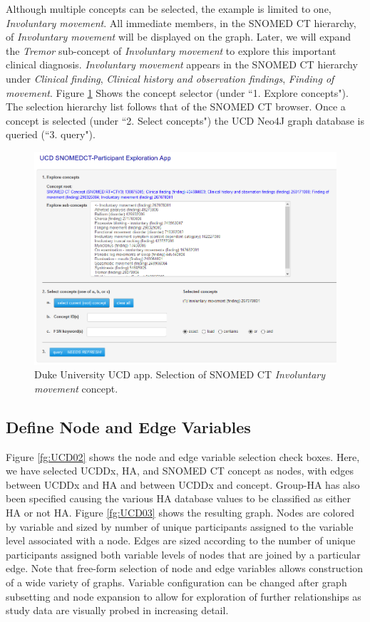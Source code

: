 \documentclass[10pt, letterpaper]{article}
\begin{document}
\begin{spacing}{1.0}
Although multiple concepts can be selected, the example is limited to one, \textit{Involuntary movement}.  All immediate members, in the SNOMED CT hierarchy, of \textit{Involuntary movement} will be displayed on the graph.  Later, we will expand the \textit{Tremor} sub-concept of \textit{Involuntary movement} to explore this important clinical diagnosis.  \textit{Involuntary movement} appears in the SNOMED CT hierarchy under \textit{Clinical finding}, \textit{Clinical history and observation findings}, \textit{Finding of movement}.  Figure \ref{fg:UCD01} Shows the concept selector (under ``1. Explore concepts").  The selection hierarchy list follows that of the SNOMED CT browser.  Once a concept is selected (under ``2. Select concepts") the UCD Neo4J graph database is queried (``3. query").

\begin{figure}[H]
    \includegraphics[width=6in]{UCD01.png}
    \centering
    \caption{Duke University UCD app.  Selection of SNOMED CT \textit{Involuntary movement} concept.}
    \label{fg:UCD01}
\end{figure}

\subsection{Define Node and Edge Variables}

Figure \ref{fg:UCD02} shows the node and edge variable selection check boxes.  Here, we have selected UCDDx, HA, and SNOMED CT concept as nodes, with edges between UCDDx and HA and between UCDDx and concept.  Group-HA has also been specified causing the various HA database values to be classified as either HA or not HA.  Figure \ref{fg:UCD03} shows the resulting graph.  Nodes are colored by variable and sized by number of unique participants assigned to the variable level associated with a node.  Edges are sized according to the number of unique participants assigned both variable levels of nodes that are joined by a particular edge.  Note that free-form selection of node and edge variables allows construction of a wide variety of graphs.  Variable configuration can be changed after graph subsetting and node expansion to allow for exploration of further relationships as study data are visually probed in increasing detail.\\


\end{spacing}
\end{document}
